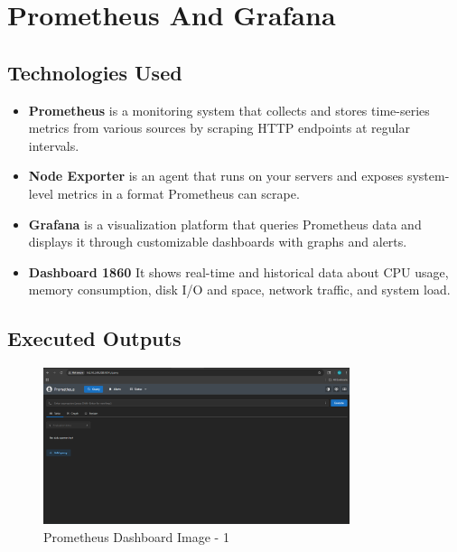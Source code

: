 \chapter{Prometheus And Grafana}
\label{chap:prometheusAndGrafana}


\section{Technologies Used}
\begin{itemize}
    \item \textbf{Prometheus} is a monitoring system that collects and stores time-series metrics from various sources by scraping HTTP endpoints at regular intervals.
    \item \textbf{Node Exporter} is an agent that runs on your servers and exposes system-level metrics in a format Prometheus can scrape.
    \item \textbf{Grafana} is a visualization platform that queries Prometheus data and displays it through customizable dashboards with graphs and alerts.
    \item \textbf{Dashboard 1860} It shows real-time and historical data about CPU usage, memory consumption, disk I/O and space, network traffic, and system load.
\end{itemize}

\section{Executed Outputs}

\begin{figure}[htbp]
    \centering
    \includegraphics[width=0.8\textwidth]{png/PrometheusAndGrafana/prometheus-dashboard.png}
    \caption{Prometheus Dashboard Image - 1}
    \label{fig:prometheusDashboard-1}
\end{figure}

